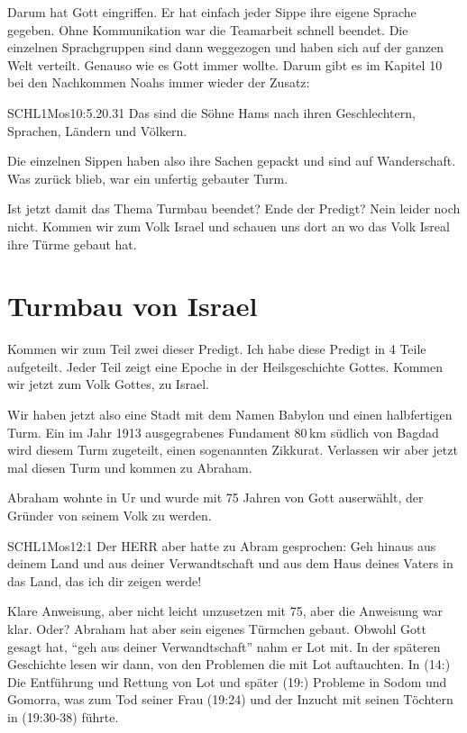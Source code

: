 \documentclass[14pt]{../../inc/mybib}
\newenvironment{block}[1][]{%
  \vspace{1.5em}%
  \noindent\textbf{#1}\par%
  \vspace{0.0em}%
}{%
  \vspace{1em}%
}
\begin{document}
\begin{block}
    Darum hat Gott eingriffen. Er hat einfach jeder Sippe ihre eigene Sprache gegeben. Ohne Kommunikation war die Teamarbeit schnell beendet. Die einzelnen Sprachgruppen sind dann weggezogen und haben sich auf der ganzen Welt verteilt. Genauso wie es Gott immer wollte.
    Darum gibt es im Kapitel 10 bei den Nachkommen Noahs immer wieder der Zusatz:
    \begin{bibelbox}{SCHL}{1Mos}{10:5.20.31}
        Das sind die Söhne Hams nach ihren Geschlechtern, Sprachen, Ländern und Völkern.
    \end{bibelbox}    
    
    Die einzelnen Sippen haben also ihre Sachen gepackt und sind auf Wanderschaft. Was zurück blieb, war ein unfertig gebauter Turm.
\end{block}
\begin{block}
    Ist jetzt damit das Thema Turmbau beendet? Ende der Predigt? Nein leider noch nicht. Kommen wir zum Volk Israel und schauen uns dort an wo das Volk Isreal ihre Türme gebaut hat.
    
    \section{Turmbau von Israel}
    Kommen wir zum Teil zwei dieser Predigt. Ich habe diese Predigt in 4 Teile aufgeteilt. Jeder Teil zeigt eine Epoche in der Heilsgeschichte Gottes. Kommen wir jetzt zum Volk Gottes, zu Israel.
\end{block}
\begin{block}
    Wir haben jetzt also eine Stadt mit dem Namen Babylon und einen halbfertigen Turm. Ein im Jahr 1913 ausgegrabenes Fundament 80\,km südlich von Bagdad wird diesem Turm zugeteilt, einen sogenannten Zikkurat. Verlassen wir aber jetzt mal diesen Turm und kommen zu Abraham.
\end{block}
\begin{block}
    Abraham wohnte in Ur und wurde mit 75 Jahren von Gott auserwählt, der Gründer von seinem Volk zu werden. 
    \begin{bibelbox}{SCHL}{1Mos}{12:1}
        Der HERR aber hatte zu Abram gesprochen: Geh hinaus aus deinem Land und aus deiner Verwandtschaft und aus dem Haus deines Vaters in das Land, das ich dir zeigen werde!
    \end{bibelbox} 

    Klare Anweisung, aber nicht leicht unzusetzen mit 75, aber die Anweisung war klar. Oder? Abraham hat aber sein eigenes Türmchen gebaut. Obwohl Gott gesagt hat, \enquote{geh aus deiner Verwandtschaft} nahm er Lot mit. In der späteren Geschichte lesen wir dann, von den Problemen die mit Lot auftauchten. In (14:) Die Entführung und Rettung von Lot und später (19:) Probleme in Sodom und Gomorra, was zum Tod seiner Frau (19:24) und der Inzucht mit seinen Töchtern in (19:30-38) führte.
\end{block}
\end{document}
